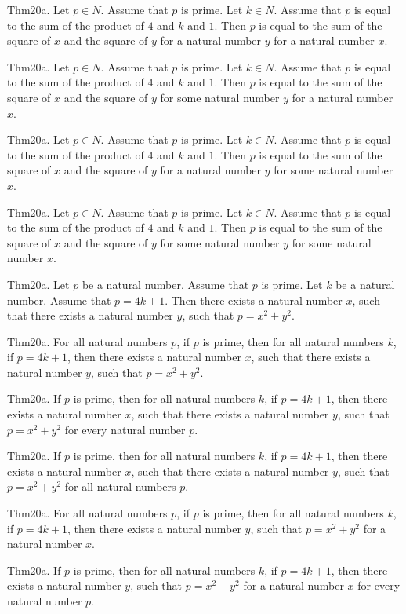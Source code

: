\documentclass{article}
\begin{document}
Thm20a. Let $p \in N$. Assume that $p$ is prime. Let $k \in N$. Assume that $p$ is equal to the sum of the product of $4$ and $k$ and $1$. Then $p$ is equal to the sum of the square of $x$ and the square of $y$ for a natural number $y$ for a natural number $x$.

Thm20a. Let $p \in N$. Assume that $p$ is prime. Let $k \in N$. Assume that $p$ is equal to the sum of the product of $4$ and $k$ and $1$. Then $p$ is equal to the sum of the square of $x$ and the square of $y$ for some natural number $y$ for a natural number $x$.

Thm20a. Let $p \in N$. Assume that $p$ is prime. Let $k \in N$. Assume that $p$ is equal to the sum of the product of $4$ and $k$ and $1$. Then $p$ is equal to the sum of the square of $x$ and the square of $y$ for a natural number $y$ for some natural number $x$.

Thm20a. Let $p \in N$. Assume that $p$ is prime. Let $k \in N$. Assume that $p$ is equal to the sum of the product of $4$ and $k$ and $1$. Then $p$ is equal to the sum of the square of $x$ and the square of $y$ for some natural number $y$ for some natural number $x$.

Thm20a. Let $p$ be a natural number. Assume that $p$ is prime. Let $k$ be a natural number. Assume that $p = 4 k + 1$. Then there exists a natural number $x$, such that there exists a natural number $y$, such that $p = x ^{ 2}+ y ^{ 2}$.

Thm20a. For all natural numbers $p$, if $p$ is prime, then for all natural numbers $k$, if $p = 4 k + 1$, then there exists a natural number $x$, such that there exists a natural number $y$, such that $p = x ^{ 2}+ y ^{ 2}$.

Thm20a. If $p$ is prime, then for all natural numbers $k$, if $p = 4 k + 1$, then there exists a natural number $x$, such that there exists a natural number $y$, such that $p = x ^{ 2}+ y ^{ 2}$ for every natural number $p$.

Thm20a. If $p$ is prime, then for all natural numbers $k$, if $p = 4 k + 1$, then there exists a natural number $x$, such that there exists a natural number $y$, such that $p = x ^{ 2}+ y ^{ 2}$ for all natural numbers $p$.

Thm20a. For all natural numbers $p$, if $p$ is prime, then for all natural numbers $k$, if $p = 4 k + 1$, then there exists a natural number $y$, such that $p = x ^{ 2}+ y ^{ 2}$ for a natural number $x$.

Thm20a. If $p$ is prime, then for all natural numbers $k$, if $p = 4 k + 1$, then there exists a natural number $y$, such that $p = x ^{ 2}+ y ^{ 2}$ for a natural number $x$ for every natural number $p$.
\end{document}

